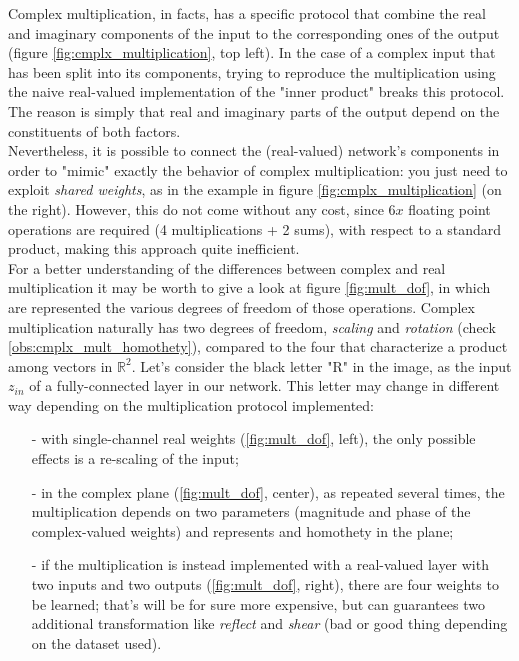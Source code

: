\documentclass[../main.tex]{subfiles}
\begin{document}
Complex multiplication, in facts, has a specific protocol that combine the real and imaginary components of the input to the corresponding ones of the output (figure \ref{fig:cmplx_multiplication}, top left). In the case of a complex input that has been split into its components, trying to reproduce the multiplication using the naive real-valued implementation of the "inner product" breaks this protocol. The reason is simply that real and imaginary parts of the output depend on the constituents of both factors.\\
Nevertheless, it is possible to connect the (real-valued) network's components in order to "mimic" exactly the behavior of complex multiplication: you just need to exploit \textit{shared weights}, as in the example in figure \ref{fig:cmplx_multiplication} (on the right). However, this do not come without any cost, since $6x$ floating point operations are required (4 multiplications + 2 sums), with respect to a standard product, making this approach quite inefficient.\\
For a better understanding of the differences between complex and real multiplication it may be worth to give a look at figure \ref{fig:mult_dof}, in which are represented the various degrees of freedom of those operations. Complex multiplication naturally has two degrees of freedom, \textit{scaling} and \textit{rotation} (check \ref{obs:cmplx_mult_homothety}), compared to the four that characterize a product among vectors in $\mathds{R}^2$. Let's consider the black letter "R" in the image, as the input $z_{in}$ of a fully-connected layer in our network. This letter may change in different way depending on the multiplication protocol implemented:
\begin{itemize}
	\item[-] with single-channel real weights (\ref{fig:mult_dof}, left), the only possible effects is a re-scaling of the input;
	\item[-] in the complex plane (\ref{fig:mult_dof}, center), as repeated several times, the multiplication depends on two parameters (magnitude and phase of the complex-valued weights) and represents and homothety in the plane;
	\item[-] if the multiplication is instead implemented with a real-valued layer with two inputs and two outputs (\ref{fig:mult_dof}, right), there are four weights to be learned; that's will be for sure more expensive, but can guarantees two additional transformation like \textit{reflect} and \textit{shear} (bad or good thing depending on the dataset used).	
\end{itemize}
\end{document}
